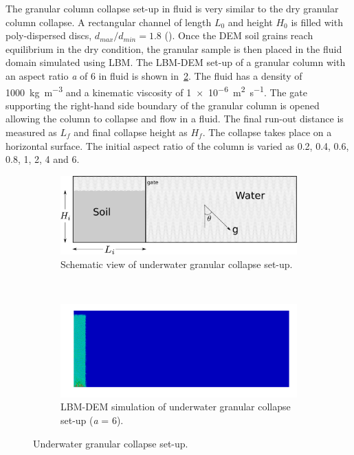 The granular column collapse set-up in fluid is very similar to the dry 
granular column collapse. A rectangular channel of length $L_0$ and height 
$H_0$ is filled with poly-dispersed discs, $d_{max}/d_{min} = 1.8$  
(). Once the DEM soil grains reach equilibrium in the dry 
condition, the granular sample is then placed in the fluid domain simulated 
using LBM. The LBM-DEM set-up of a granular column with an aspect ratio 
\textit{a} of 6 in fluid is shown in~\cref{fig:LBMgeometry}. The fluid has a 
density of 
\SI{1000}{\kg\per\cubic\meter}  and a kinematic viscosity of 
\SI{1e-6}{\square\meter\per\second}. The gate supporting the right-hand 
side 
boundary of the granular column is opened allowing the column to collapse and 
flow in a fluid. The final run-out distance is measured as $L_f$ and 
final collapse height as $H_f$. The collapse takes place on a horizontal 
surface. The initial aspect ratio of the column is varied as 0.2, 0.4, 0.6, 
0.8, 1, 2, 4 and 6. 

\begin{figure}[htpb]
\centering
\begin{subfigure}[b]{0.95\textwidth}
\centering
\includegraphics[width=0.97\columnwidth]{geometry}
\caption{Schematic view of underwater granular collapse set-up.}
\label{fig:geometry}
\end{subfigure} \\

\begin{subfigure}[b]{0.95\textwidth}
\centering
\includegraphics[width=0.97\columnwidth]{a6/ini_a6_geom}
\caption{LBM-DEM simulation of underwater granular collapse set-up (\textit{a} 
= 6).}
\label{fig:LBMgeometry}
\end{subfigure}
\caption{Underwater granular collapse set-up.}
\label{fig:LBM_Scheme_geometry}
\end{figure}


